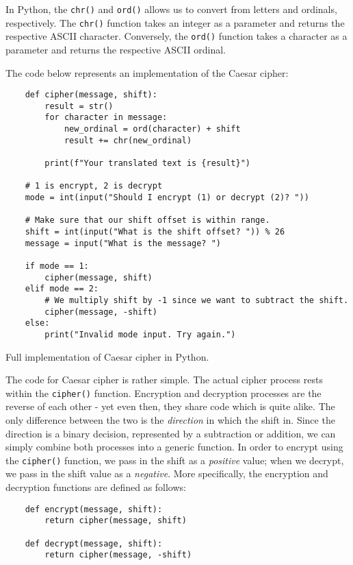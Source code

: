 In Python, the \texttt{chr()} and \texttt{ord()} allows us to convert from letters and ordinals, respectively. 
The \texttt{chr()} function takes an integer as a parameter and returns the respective ASCII character. Conversely, 
the \texttt{ord()} function takes a character as a parameter and returns the respective ASCII ordinal. 

The code below represents an implementation of the Caesar cipher:

\begin{listing}[H]
    \begin{verbatim}
    def cipher(message, shift):
        result = str()
        for character in message:
            new_ordinal = ord(character) + shift
            result += chr(new_ordinal)
        
        print(f"Your translated text is {result}")
    
    # 1 is encrypt, 2 is decrypt
    mode = int(input("Should I encrypt (1) or decrypt (2)? "))
    
    # Make sure that our shift offset is within range.
    shift = int(input("What is the shift offset? ")) % 26
    message = input("What is the message? ")
    
    if mode == 1:
        cipher(message, shift)
    elif mode == 2:
        # We multiply shift by -1 since we want to subtract the shift.
        cipher(message, -shift)
    else:
        print("Invalid mode input. Try again.")    
        \end{verbatim}
        \caption{Full implementation of Caesar cipher in Python.}
\end{listing}

The code for Caesar cipher is rather simple. The actual cipher process rests within the \texttt{cipher()} function.
Encryption and decryption processes are the reverse of each other - yet even then, they share code which is quite alike.
The only difference between the two is the \textit{direction} in which the shift in. Since the direction is a binary decision, 
represented by a subtraction or addition, we can simply combine both processes into a generic function. In order to encrypt
using the \texttt{cipher()} function, we pass in the shift as a \textit{positive} value; when we decrypt, we pass in the shift
value as a \textit{negative}. More specifically, the encryption and decryption functions are defined as follows:

\begin{verbatim}
    def encrypt(message, shift):
        return cipher(message, shift)

    def decrypt(message, shift):
        return cipher(message, -shift)
\end{verbatim}


